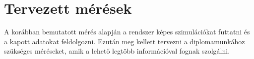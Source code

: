 




\section{Tervezett mérések}
A korábban bemutatott mérés alapján a rendszer képes szimulációkat futtatni és a kapott adatokat feldolgozni.
Ezután meg kellett tervezni a diplomamunkához szükséges méréseket, amik a lehető legtöbb információval fognak szolgálni.

